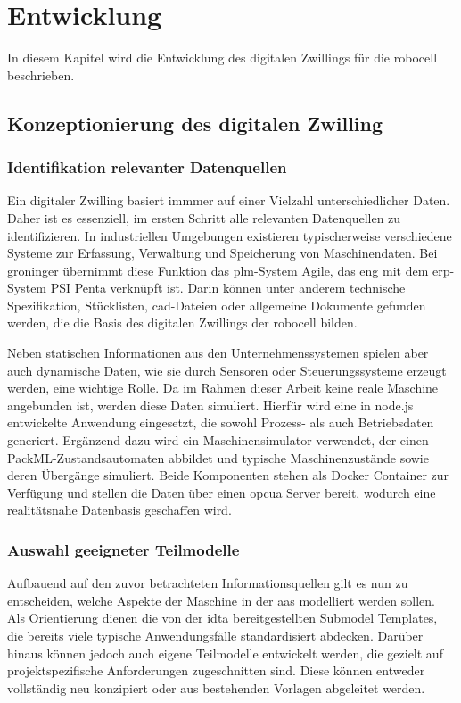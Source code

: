 \section{Entwicklung}
In diesem Kapitel wird die Entwicklung des digitalen Zwillings für die robocell beschrieben.
\subsection{Konzeptionierung des digitalen Zwilling}


\subsubsection{Identifikation relevanter Datenquellen}
Ein digitaler Zwilling basiert immmer auf einer Vielzahl unterschiedlicher Daten. 
Daher ist es essenziell, im ersten Schritt alle relevanten Datenquellen zu identifizieren.
In industriellen Umgebungen existieren typischerweise verschiedene Systeme zur Erfassung, Verwaltung und Speicherung von Maschinendaten.
Bei groninger übernimmt diese Funktion das \acs{plm}-System Agile, das eng mit dem \acs{erp}-System PSI Penta verknüpft ist.
Darin können unter anderem technische Spezifikation, Stücklisten, \acs{cad}-Dateien oder allgemeine Dokumente gefunden werden, die die Basis des digitalen Zwillings der robocell bilden.

Neben statischen Informationen aus den Unternehmenssystemen spielen aber auch dynamische Daten, wie sie durch Sensoren oder Steuerungssysteme erzeugt werden, eine wichtige Rolle.
Da im Rahmen dieser Arbeit keine reale Maschine angebunden ist, werden diese Daten simuliert.
Hierfür wird eine in node.js entwickelte Anwendung eingesetzt, die sowohl Prozess- als auch Betriebsdaten generiert. 
Ergänzend dazu wird ein Maschinensimulator verwendet, der einen PackML-Zustandsautomaten abbildet und typische Maschinenzustände sowie deren Übergänge simuliert. 
Beide Komponenten stehen als Docker Container zur Verfügung und stellen die Daten über einen \acs{opcua} Server bereit, wodurch eine realitätsnahe Datenbasis geschaffen wird.
\subsubsection{Auswahl geeigneter Teilmodelle}
Aufbauend auf den zuvor betrachteten Informationsquellen gilt es nun zu entscheiden, welche Aspekte der Maschine in der \acs{aas} modelliert werden sollen.
Als Orientierung dienen die von der \acs{idta} bereitgestellten Submodel Templates, die bereits viele typische Anwendungsfälle standardisiert abdecken.
Darüber hinaus können jedoch auch eigene Teilmodelle entwickelt werden, die gezielt auf projektspezifische Anforderungen zugeschnitten sind.
Diese können entweder vollständig neu konzipiert oder aus bestehenden Vorlagen abgeleitet werden.

